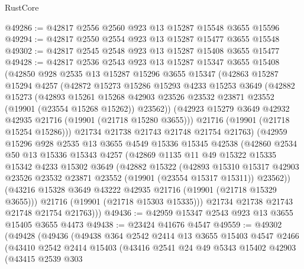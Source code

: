 \begin{lexlean}{RustCore}
\begin{coremodule}
@49286 := @42817 @2556 @2560 @923 @13 @15287 @15548 @3655 @15596
@49294 := @42817 @2550 @2554 @923 @13 @15287 @15477 @3655 @15548
@49302 := @42817 @2545 @2548 @923 @13 @15287 @15408 @3655 @15477
@49428 := @42817
    @2536
    @2543
    @923
    @13
    @15287
    @15347
    @3655
    @15408
    (@42850
      @928
      @2535
      @13
      @15287
      @15296
      @3655
      @15347
      (@42863
        @15287
        @15294
        @4257
        (@42872
          @15273
          @15286
          @15293
          @4233
          @15253
          @3649
          (@42882
            @15273
            (@42893
              @15261
              @15268
              @42903
              @23526
              @23532
              @23871
              @23552
              (@19901 (@23554 @15268 @15262))
              @23562))
          (@42923 @15279 @3649 @42932 @42935 @21716 (@19901 (@21718 @15280 @3655)))
          @21716
          (@19901 (@21718 @15254 @15286)))
        @21734
        @21738
        @21743
        @21748
        @21754
        @21763)
      (@42959
        @15296
        @928
        @2535
        @13
        @3655
        @4549
        @15336
        @15345
        @42538
        (@42860
          @2534
          @50
          @13
          @15336
          @15343
          @4257
          (@42869
            @1135
            @11
            @49
            @15322
            @15335
            @15342
            @4233
            @15302
            @3649
            (@42882
              @15322
              (@42893
                @15310
                @15317
                @42903
                @23526
                @23532
                @23871
                @23552
                (@19901 (@23554 @15317 @15311))
                @23562))
            (@43216 @15328 @3649 @43222 @42935 @21716 (@19901 (@21718 @15329 @3655)))
            @21716
            (@19901 (@21718 @15303 @15335)))
          @21734
          @21738
          @21743
          @21748
          @21754
          @21763)))
@49436 := @42959 @15347 @2543 @923 @13 @3655 @15405 @3655 @4473
@49438 := @23424 @41676 @4547
@49559 := @49302
    (@49428
      (@49436
        (@49438
          @364
          @2542
          @2414
          @13
          @3655
          @15403
          @4547
          @2466
          (@43410
            @2542
            @2414
            @15403
            (@43416
              @2541
              @24
              @49
              @5343
              @15402
              @42903
              (@43415
                @2539
                @303

\end{coremodule}
\end{lexlean}
